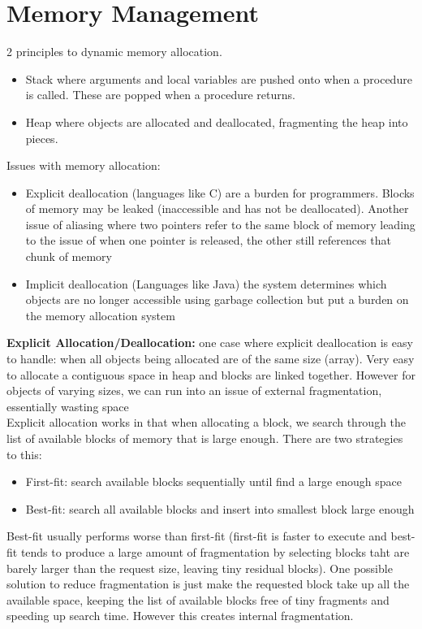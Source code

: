 \documentclass{article}
\begin{document}
  \section{Memory Management}
  2 principles to dynamic memory allocation. 
  \begin{itemize}[noitemsep]
  \item Stack where arguments and local variables are pushed onto when a procedure is called. These are popped when a procedure returns. 
  \item Heap where objects are allocated and deallocated, fragmenting the heap into pieces.
  \end{itemize}
  Issues with memory allocation:
  \begin{itemize}[noitemsep]
    \item Explicit deallocation (languages like C) are a burden for programmers. Blocks of memory may be leaked (inaccessible and has not be deallocated). Another issue of aliasing where two pointers refer to the same block of memory leading to the issue of when one pointer is released, the other still references that chunk of memory
    \item Implicit deallocation (Languages like Java) the system determines which objects are no longer accessible using garbage collection but put a burden on the memory allocation system \\
  \end{itemize}
  \textbf{Explicit Allocation/Deallocation: }one case where explicit deallocation is easy to handle: when all objects being allocated are of the same size (array). Very easy to allocate a contiguous space in heap and blocks are linked together. However for objects of varying sizes, we can run into an issue of external fragmentation, essentially wasting space\\ 
  Explicit allocation works in that when allocating a block, we search through the list of available blocks of memory that is large enough. There are two strategies to this:
  \begin{itemize}
    \item First-fit: search available blocks sequentially until find a large enough space
    \item Best-fit: search all available blocks and insert into smallest block large enough
  \end{itemize}
  Best-fit usually performs worse than first-fit (first-fit is faster to execute and best-fit tends to produce a large amount of fragmentation by selecting blocks taht are barely larger than the request size, leaving tiny residual blocks). One possible solution to reduce fragmentation is just make the requested block take up all the available space, keeping the list of available blocks free of tiny fragments and speeding up search time. However this creates internal fragmentation.\\
\end{document}
